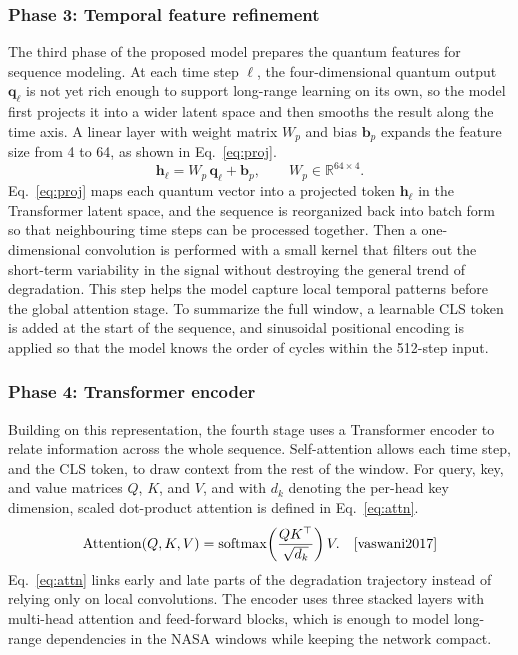 \documentclass[a4paper,fleqn]{cas-sc}
\begin{document}
\subsubsection{Phase 3: Temporal feature refinement}
The third phase of the proposed model prepares the quantum features for sequence modeling. At each time step $\ell$, the four-dimensional quantum output $\mathbf{q}_{\ell}$ is not yet rich enough to support long-range learning on its own, so the model first projects it into a wider latent space and then smooths the result along the time axis. A linear layer with weight matrix $W_{p}$ and bias $\mathbf{b}_{p}$ expands the feature size from 4 to 64, as shown in Eq.~\eqref{eq:proj}.
\begin{equation}
\mathbf{h}_{\ell} = W_{p}\,\mathbf{q}_{\ell} + \mathbf{b}_{p}, \qquad W_{p}\in\mathbb{R}^{64\times 4}.
\label{eq:proj}
\end{equation}
Eq.~\eqref{eq:proj} maps each quantum vector into a projected token $\mathbf{h}_{\ell}$ in the Transformer latent space, and the sequence is reorganized back into batch form so that neighbouring time steps can be processed together. Then a one-dimensional convolution is performed with a small kernel that filters out the short-term variability in the signal without destroying the general trend of degradation. This step helps the model capture local temporal patterns before the global attention stage. To summarize the full window, a learnable CLS token is added at the start of the sequence, and sinusoidal positional encoding is applied so that the model knows the order of cycles within the 512-step input.

\subsubsection{Phase 4: Transformer encoder}
Building on this representation, the fourth stage uses a Transformer encoder to relate information across the whole sequence. Self-attention allows each time step, and the CLS token, to draw context from the rest of the window. For query, key, and value matrices $Q$, $K$, and $V$, and with $d_{k}$ denoting the per-head key dimension, scaled dot-product attention is defined in Eq.~\eqref{eq:attn}.
\begin{equation}
\mathrm{Attention}(Q,K,V)
=
\mathrm{softmax}\!\left(\frac{QK^{\top}}{\sqrt{d_{k}}}\right)V. \quad \cite{vaswani2017}
\label{eq:attn}
\end{equation}
Eq.~\eqref{eq:attn} links early and late parts of the degradation trajectory instead of relying only on local convolutions. The encoder uses three stacked layers with multi-head attention and feed-forward blocks, which is enough to model long-range dependencies in the NASA windows while keeping the network compact.
\end{document}
